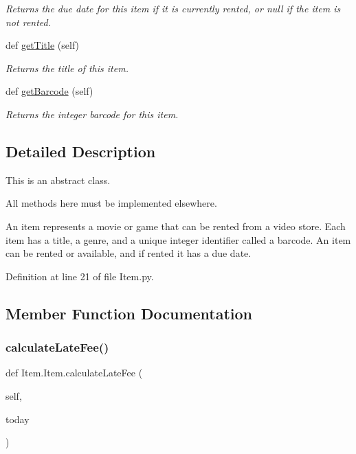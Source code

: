 \begin{DoxyCompactItemize}
\begin{DoxyCompactList}\small\item\em Returns the due date for this item if it is currently rented, or null if the item is not rented. \end{DoxyCompactList}\item 
def \hyperlink{classItem_1_1Item_a2b359025258f0b0f0ef33d7da4f806fa}{get\+Title} (self)
\begin{DoxyCompactList}\small\item\em Returns the title of this item. \end{DoxyCompactList}\item 
def \hyperlink{classItem_1_1Item_ac53c971f8932eb428ee5a9999ba8c541}{get\+Barcode} (self)
\begin{DoxyCompactList}\small\item\em Returns the integer barcode for this item. \end{DoxyCompactList}\end{DoxyCompactItemize}


\subsection{Detailed Description}
This is an abstract class. 

All methods here must be implemented elsewhere.

An item represents a movie or game that can be rented from a video store. Each item has a title, a genre, and a unique integer identifier called a barcode. An item can be rented or available, and if rented it has a due date. 

Definition at line 21 of file Item.\+py.



\subsection{Member Function Documentation}
\mbox{\label{classItem_1_1Item_a17d1bdd2d1f6d4ad81a9d1fd0b2d149d}} 
\subsubsection{\texorpdfstring{calculate\+Late\+Fee()}{calculateLateFee()}}
{\footnotesize\ttfamily def Item.\+Item.\+calculate\+Late\+Fee (\begin{DoxyParamCaption}\item[{}]{self,  }\item[{}]{today }\end{DoxyParamCaption})}



